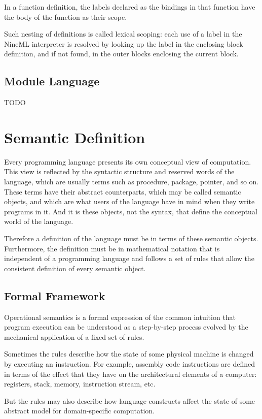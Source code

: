 \documentclass[10pt]{article}
\begin{document}
In a function definition, the labels declared as the bindings in that
function have the body of the function as their scope. 

Such nesting of definitions is called lexical scoping: each use of
a label in the NineML interpreter is resolved by looking up the label
in the enclosing block definition, and if not found, in the outer
blocks enclosing the current block. 

\subsection*{Module Language}
TODO

\section*{Semantic Definition}
Every programming language presents its own conceptual view of
computation. This view is reflected by the syntactic structure and
reserved words of the language, which are usually terms such as
procedure, package, pointer, and so on. These terms have their
abstract counterparts, which may be called semantic objects, and which
are what users of the language have in mind when they write programs
in it. And it is these objects, not the syntax, that define the
conceptual world of the language. 

Therefore a definition of the language must be in terms of these
semantic objects. Furthermore, the definition must be in mathematical
notation that is independent of a programming language and follows a
set of rules that allow the consistent definition of every semantic
object. 

\subsection*{Formal Framework}
Operational semantics is a formal expression of the common
intuition that program execution can be understood as a step-by-step
process evolved by the mechanical application of a fixed set of
rules. 

Sometimes the rules describe how the state of some physical machine is
changed by executing an instruction. For example, assembly code
instructions are defined in terms of the effect that they have on the
architectural elements of a computer: registers, stack, memory,
instruction stream, etc. 

But the rules may also describe how language constructs affect the
state of some abstract model for domain-specific computation. 
\end{document}
